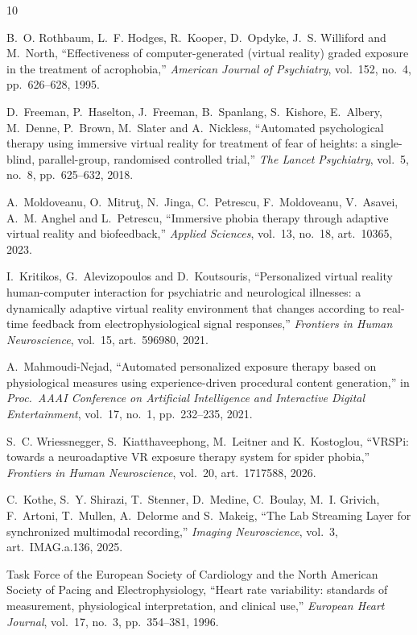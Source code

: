 \documentclass[11pt,a4paper]{article}
\begin{document}
\begin{thebibliography}{10}
\small

B.~O. Rothbaum, L.~F. Hodges, R.~Kooper, D.~Opdyke, J.~S. Williford and
M.~North, ``Effectiveness of computer-generated (virtual reality) graded
exposure in the treatment of acrophobia,'' \emph{American Journal of
Psychiatry}, vol.~152, no.~4, pp.~626--628, 1995.

D.~Freeman, P.~Haselton, J.~Freeman, B.~Spanlang, S.~Kishore, E.~Albery,
M.~Denne, P.~Brown, M.~Slater and A.~Nickless, ``Automated psychological
therapy using immersive virtual reality for treatment of fear of heights:
a single-blind, parallel-group, randomised controlled trial,'' \emph{The
Lancet Psychiatry}, vol.~5, no.~8, pp.~625--632, 2018.

A.~Moldoveanu, O.~Mitru\c{t}, N.~Jinga, C.~Petrescu, F.~Moldoveanu,
V.~Asavei, A.~M. Anghel and L.~Petrescu, ``Immersive phobia therapy
through adaptive virtual reality and biofeedback,'' \emph{Applied
Sciences}, vol.~13, no.~18, art.~10365, 2023.

I.~Kritikos, G.~Alevizopoulos and D.~Koutsouris, ``Personalized virtual
reality human-computer interaction for psychiatric and neurological
illnesses: a dynamically adaptive virtual reality environment that
changes according to real-time feedback from electrophysiological signal
responses,'' \emph{Frontiers in Human Neuroscience}, vol.~15,
art.~596980, 2021.

A.~Mahmoudi-Nejad, ``Automated personalized exposure therapy based on
physiological measures using experience-driven procedural content
generation,'' in \emph{Proc.\ AAAI Conference on Artificial Intelligence
and Interactive Digital Entertainment}, vol.~17, no.~1, pp.~232--235,
2021.

S.~C. Wriessnegger, S.~Kiatthaveephong, M.~Leitner and K.~Kostoglou,
``VRSPi: towards a neuroadaptive VR exposure therapy system for spider
phobia,'' \emph{Frontiers in Human Neuroscience}, vol.~20, art.~1717588,
2026.

C.~Kothe, S.~Y. Shirazi, T.~Stenner, D.~Medine, C.~Boulay, M.~I.
Grivich, F.~Artoni, T.~Mullen, A.~Delorme and S.~Makeig, ``The Lab
Streaming Layer for synchronized multimodal recording,'' \emph{Imaging
Neuroscience}, vol.~3, art.~IMAG.a.136, 2025.

Task Force of the European Society of Cardiology and the North American
Society of Pacing and Electrophysiology, ``Heart rate variability:
standards of measurement, physiological interpretation, and clinical
use,'' \emph{European Heart Journal}, vol.~17, no.~3, pp.~354--381,
1996.


\end{thebibliography}
\end{document}
